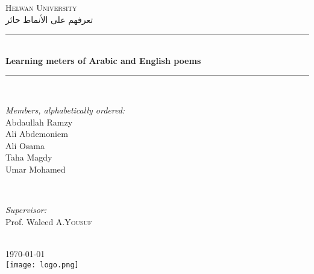 \documentclass[12pt]{article}
\begin{document}
\begin{titlepage}

\newcommand{\HRule}{\rule{\linewidth}{0.5mm}} %

\center %
 

\textsc{\LARGE Helwan University}\\[1.5cm] %
\textsc{\Large \textarabic{تعرفهم على الأنماط حائر}}\\[0.5cm] %


\HRule \\[0.4cm]
{ \LARGE \bfseries Learning meters of Arabic and English poems}\\[0.4cm] %
\HRule \\[1.5cm]
 

\begin{minipage}{0.4\textwidth}
\begin{flushleft} \large
\emph{Members, \textit{\small alphabetically ordered}:}\\

\small{Abdaullah Ramzy}\\
\small{Ali Abdemoniem}\\
\small{Ali Osama}\\
\small{Taha Magdy}\\
\small{Umar Mohamed}\\
\end{flushleft}
\end{minipage}
~
\begin{minipage}{0.4\textwidth}
\begin{flushright} \large
\emph{Supervisor:} \\
Prof. Waleed A.\textsc{Yousuf} %
\end{flushright}
\end{minipage}\\[2cm]



{\large \today}\\[2cm] %

\texttt{[image: logo.png]}\\[1cm] %

\vfill %

\end{titlepage}
\end{document}
